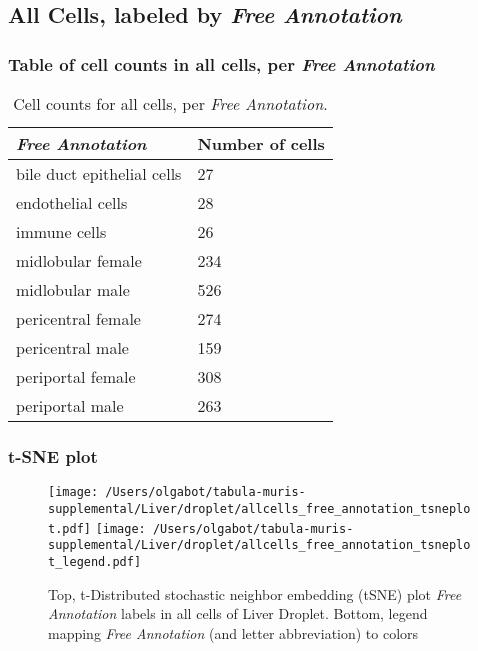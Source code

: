 \subsection{All Cells, labeled by \emph{Free Annotation}}
\subsubsection{Table of cell counts in all cells, per \emph{Free Annotation}}\begin{table}[h]
\centering
\label{my-label}
\begin{tabular}{@{}ll@{}}
\toprule

\emph{Free Annotation}& Number of cells \\ \midrule
bile duct epithelial cells & 27 \\

endothelial cells & 28 \\

immune cells & 26 \\

midlobular female & 234 \\

midlobular male & 526 \\

pericentral female & 274 \\

pericentral male & 159 \\

periportal female & 308 \\

periportal male & 263 \\
\bottomrule
\end{tabular}
\caption{Cell counts for all cells, per \emph{Free Annotation}.}
\end{table}

\clearpage
\subsubsection{t-SNE plot}
\begin{figure}[h]
\centering
\texttt{[image: /Users/olgabot/tabula-muris-supplemental/Liver/droplet/allcells\_free\_annotation\_tsneplot.pdf]}
\texttt{[image: /Users/olgabot/tabula-muris-supplemental/Liver/droplet/allcells\_free\_annotation\_tsneplot\_legend.pdf]}
\caption{Top, t-Distributed stochastic neighbor embedding (tSNE) plot  \emph{Free Annotation} labels in all cells of Liver Droplet. Bottom, legend mapping \emph{Free Annotation} (and letter abbreviation) to colors}
\end{figure}


